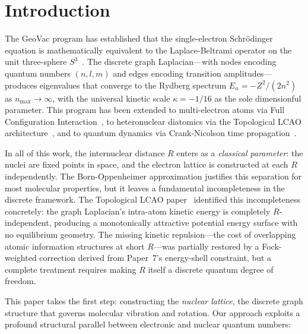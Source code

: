 \documentclass[aps,pra,twocolumn,superscriptaddress,longbibliography]{revtex4-2}
\begin{document}
\maketitle


\section{Introduction}
\label{sec:intro}

The GeoVac program has established that the single-electron
Schr\"odinger equation is mathematically equivalent to the
Laplace-Beltrami operator on the unit three-sphere
$S^3$~\cite{paper0,paper1,paper7}.  The discrete graph Laplacian---with
nodes encoding quantum numbers $(n, l, m)$ and edges encoding transition
amplitudes---produces eigenvalues that converge to the Rydberg spectrum
$E_n = -Z^2/(2n^2)$ as $n_{\max} \to \infty$, with the universal
kinetic scale $\kappa = -1/16$ as the sole dimensionful parameter.  This
program has been extended to multi-electron atoms via Full Configuration
Interaction~\cite{fci_paper}, to heteronuclear diatomics via the
Topological LCAO architecture~\cite{lcao_paper}, and to quantum dynamics
via Crank-Nicolson time propagation~\cite{paper6}.

In all of this work, the internuclear distance $R$ enters as a
\emph{classical parameter}: the nuclei are fixed points in space, and
the electron lattice is constructed at each $R$ independently.  The
Born-Oppenheimer approximation justifies this separation for most
molecular properties, but it leaves a fundamental incompleteness in the
discrete framework.  The Topological LCAO paper~\cite{lcao_paper}
identified this incompleteness concretely: the graph Laplacian's
intra-atom kinetic energy is completely $R$-independent, producing a
monotonically attractive potential energy surface with no equilibrium
geometry.  The missing kinetic repulsion---the cost of overlapping
atomic information structures at short $R$---was partially restored by a
Fock-weighted correction derived from Paper~7's energy-shell constraint,
but a complete treatment requires making $R$ itself a discrete quantum
degree of freedom.

This paper takes the first step: constructing the \emph{nuclear
lattice}, the discrete graph structure that governs molecular vibration
and rotation.  Our approach exploits a profound structural parallel
between electronic and nuclear quantum numbers:
\end{document}
